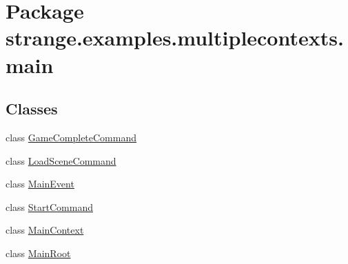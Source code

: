 \hypertarget{namespacestrange_1_1examples_1_1multiplecontexts_1_1main}{\section{Package strange.\-examples.\-multiplecontexts.\-main}
\label{namespacestrange_1_1examples_1_1multiplecontexts_1_1main}
}
\subsection*{Classes}
\begin{DoxyCompactItemize}
\item 
class \hyperlink{classstrange_1_1examples_1_1multiplecontexts_1_1main_1_1_game_complete_command}{Game\-Complete\-Command}
\item 
class \hyperlink{classstrange_1_1examples_1_1multiplecontexts_1_1main_1_1_load_scene_command}{Load\-Scene\-Command}
\item 
class \hyperlink{classstrange_1_1examples_1_1multiplecontexts_1_1main_1_1_main_event}{Main\-Event}
\item 
class \hyperlink{classstrange_1_1examples_1_1multiplecontexts_1_1main_1_1_start_command}{Start\-Command}
\item 
class \hyperlink{classstrange_1_1examples_1_1multiplecontexts_1_1main_1_1_main_context}{Main\-Context}
\item 
class \hyperlink{classstrange_1_1examples_1_1multiplecontexts_1_1main_1_1_main_root}{Main\-Root}
\end{DoxyCompactItemize}
